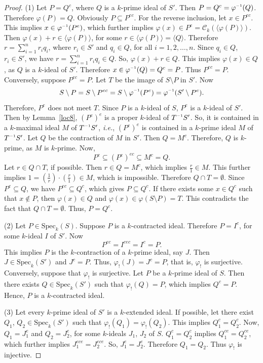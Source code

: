 \documentclass[11pt,leqno]{amsart}
\newcommand{\inv}{^{\raisebox{.2ex}{$\scriptscriptstyle-1$}}}
\theoremstyle{definition}
\numberwithin{equation}{section}
\begin{document}
\begin{proof}
(1) Let $P=Q^{c}$, where $Q$ is a $k$-prime ideal of $S'$. Then $P=Q^{c}=\varphi\inv(Q)$. Therefore $\varphi(P)=Q$. Obviously $P\subseteq P^{ec}$. For the reverse inclusion, let $x\in P^{ec}$. This implies $x\in \varphi\inv(P^e)$, which further implies $\varphi(x)\in P^{e}=\mathcal{C}_k(\langle \varphi(P)\rangle)$. Then $\varphi(x)+r\in \langle\varphi(P)\rangle$, for some $r\in\langle\varphi(P)\rangle=\langle Q \rangle$. Therefore $r=\sum\limits_{i=1}^n r_iq_i$, where $r_i\in S'$ and $q_i\in Q$, for all $i=1,2,\ldots,n$. Since $q_i\in Q$, $r_i\in S'$, we have $r=\sum\limits_{i=1}^n r_iq_i\in Q$. So, $\varphi(x)+r\in Q$. This implies $\varphi(x)\in Q$, as $Q$ is a $k$-ideal of $S'$. Therefore $x\in \varphi\inv(Q)=Q^c=P$. Thus $P^{ec}=P$.
Conversely, suppose $P^{ec}=P$. Let $T$ be the image of $S\setminus P$ in $S'$. Now \[S\setminus P=S\setminus P^{ec}=S\setminus \varphi\inv(P^e)=\varphi\inv(S'\setminus P^e).\] Therefore, $P^e$ does not meet $T$. Since $P$ is a $k$-ideal of $S$, $P^e$ is a $k$-ideal of $S'$. Then by Lemma~\ref{loc8}, $(P^e)^e$ is a proper $k$-ideal of $T\inv S'$. So, it is contained in a $k$-maximal ideal $M$ of $T\inv S'$, \textit{i.e.}, $(P^e)^e$ is contained in a $k$-prime ideal $M$ of $T\inv S'$. Let $Q$ be the contraction of $M$ in $S'$. Then $Q=M^c$. Therefore, $Q$ is $k$-prime, as $M$ is $k$-prime. Now, \[P^e\subseteq (P^e)^{ec}\subseteq M^c=Q.\] Let $r\in Q\cap T$, if possible. Then $r\in Q=M^c$, which implies $\frac{r}{1}\in M$. This further implies $1=(\frac{1}{r})\cdot(\frac{r}{1})\in M$, which is impossible. Therefore $Q\cap T=\emptyset$. Since $P^e\subseteq Q$, we have $P^{ec}\subseteq Q^c$, which gives $P\subseteq Q^c$. If there exists some $x\in Q^c$ such that $x\notin P$, then $\varphi(x)\in Q$ and $\varphi(x)\in \varphi(S\setminus P)=T$. This contradicts the fact that $Q\cap T=\emptyset$. Thus, $P=Q^c$.

 (2) Let $P\in \mathrm{Spec}_k(S)$. Suppose $P$ is a $k$-contracted ideal. Therefore $P=I^c$, for some $k$-ideal $I$ of $S'$. Now \[P^{ec}=I^{cec}=I^c=P.\] This implies $P$ is the $k$-contraction of a $k$-prime ideal, say $J$. Then $J\in \mathrm{Spec}_k(S')$ and $J^c=P$. Thus, $\varphi_!(J)=J^c=P$, that is,  $\varphi_!$ is surjective.
Conversely, suppose that $\varphi_!$ is surjective. Let $P$ be a $k$-prime ideal of $S$. Then there exists $Q\in \mathrm{Spec}_k(S')$ such that $\varphi_!(Q)=P$, which implies $Q^c=P$. Hence, $P$ is a $k$-contracted ideal.

 (3) Let every $k$-prime ideal of $S'$ is a $k$-extended ideal. If possible, let there exist $Q_1$, $Q_2\in \mathrm{Spec}_k(S')$ such that $\varphi_!(Q_1)=\varphi_!(Q_2)$. This implies $Q_1^c=Q_2^c$. Now, $Q_1=J_1^e$ and $Q_2=J_2^e$, for some $k$-ideals $J_1$, $J_2$ of $S$. $Q_1^c=Q_2^c$ implies $Q_1^{ce}=Q_2^{ce}$, which further implies $J_1^{ece}=J_2^{ece}$. So, $J_1^e=J_2^e$. Therefore $Q_1=Q_2$. Thus $\varphi_!$ is injective.	
\end{proof}
\end{document}
